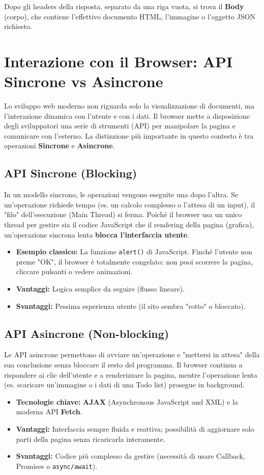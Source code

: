 \documentclass[11pt,a4paper]{report}
\begin{document}
Dopo gli headers della risposta, separato da una riga vuota, si trova il \textbf{Body} (corpo), che contiene l'effettivo documento HTML, l'immagine o l'oggetto JSON richiesto.

\section{Interazione con il Browser: API Sincrone vs Asincrone}
Lo sviluppo web moderno non riguarda solo la visualizzazione di documenti, ma l'interazione dinamica con l'utente e con i dati. Il browser mette a disposizione degli sviluppatori una serie di strumenti (API) per manipolare la pagina e comunicare con l'esterno. La distinzione più importante in questo contesto è tra operazioni \textbf{Sincrone} e \textbf{Asincrone}.

\subsection{API Sincrone (Blocking)}
In un modello sincrono, le operazioni vengono eseguite una dopo l'altra. Se un'operazione richiede tempo (es. un calcolo complesso o l'attesa di un input), il "filo" dell'esecuzione (Main Thread) si ferma. Poiché il browser usa un unico thread per gestire sia il codice JavaScript che il rendering della pagina (grafica), un'operazione sincrona lenta \textbf{blocca l'interfaccia utente}.
\begin{itemize}
    \item \textbf{Esempio classico:} La funzione \texttt{alert()} di JavaScript. Finché l'utente non preme "OK", il browser è totalmente congelato: non puoi scorrere la pagina, cliccare pulsanti o vedere animazioni.
    \item \textbf{Vantaggi:} Logica semplice da seguire (flusso lineare).
    \item \textbf{Svantaggi:} Pessima esperienza utente (il sito sembra "rotto" o bloccato).
\end{itemize}

\subsection{API Asincrone (Non-blocking)}
Le API asincrone permettono di avviare un'operazione e "mettersi in attesa" della sua conclusione senza bloccare il resto del programma. Il browser continua a rispondere ai clic dell'utente e a renderizzare la pagina, mentre l'operazione lenta (es. scaricare un'immagine o i dati di una Todo list) prosegue in background.
\begin{itemize}
    \item \textbf{Tecnologie chiave:} \textbf{AJAX} (Asynchronous JavaScript and XML) e la moderna API \textbf{Fetch}.
    \item \textbf{Vantaggi:} Interfaccia sempre fluida e reattiva; possibilità di aggiornare solo parti della pagina senza ricaricarla interamente.
    \item \textbf{Svantaggi:} Codice più complesso da gestire (necessità di usare Callback, Promises o \texttt{async/await}).
\end{itemize}
\end{document}
